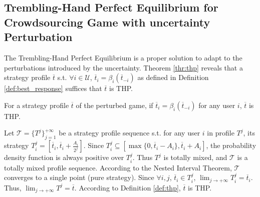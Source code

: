 \documentclass{IEEEtran}
\begin{document}
\subsection{Trembling-Hand Perfect Equilibrium for Crowdsourcing Game with uncertainty Perturbation}
The Trembling-Hand Perfect Equilibrium is a proper solution to adapt to the perturbations introduced by the uncertainty. Theorem \ref{thr:thp} reveals that a strategy profile $\overline{t}$ s.t. $\forall i\in\mathcal{U}$, $\overline{t}_i=\beta_i(\overline{t}_{-i})$ as defined in Definition \ref{def:best_response} suffices that $\overline{t}$ is THP.

\begin{theorem}
\label{thr:thp}
For a strategy profile $\overline{t}$ of the perturbed game, if $\overline{t}_i=\beta_i(\overline{t}_{-i})$ for any user $i$, $\overline{t}$ is THP.
\end{theorem}
\begin{IEEEproof}
Let $\mathcal{T}=\{T^j\}_{j=1}^{+\infty}$ be a strategy profile sequence s.t. for any user $i$ in profile $T^j$, its strategy $T_i^j=[\overline{t}_i,\overline{t}_i+\frac{A_i}{2^j}]$. Since $T_i^j \subseteq [\max\{0,\overline{t}_i-A_i\},\overline{t}_i+A_i]$, the probability density function is always positive over $T_i^j$. Thus $T^j$ is totally mixed, and $\mathcal{T}$ is a totally mixed profile sequence. According to the Nested Interval Theorem, $\mathcal{T}$ converges to a single point (pure strategy). Since $\forall i,j$, $\overline{t}_i\in T_i^j$, $\lim_{j\rightarrow +\infty}T_i^j=\overline{t}_i$. Thus, $\lim_{j\rightarrow +\infty}T^j=\overline{t}$. According to Definition \ref{def:thp}, $\overline{t}$ is THP.
\end{IEEEproof}
\end{document}
